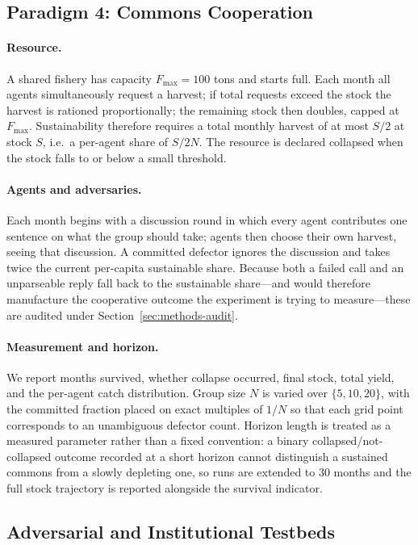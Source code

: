 \documentclass[manuscript,screen,review]{acmart}
\begin{document}
{\subsection{Paradigm 4: Commons Cooperation}
\label{sec:methods-govsim}
\paragraph{Resource.} A shared fishery has capacity $F_{\max}=100$ tons and
starts full. Each month all agents simultaneously request a harvest; if total
requests exceed the stock the harvest is rationed proportionally; the remaining
stock then doubles, capped at $F_{\max}$. Sustainability therefore requires a
total monthly harvest of at most $S/2$ at stock $S$, i.e.\ a per-agent share of
$S/2N$. The resource is declared collapsed when the stock falls to or below a
small threshold.

\paragraph{Agents and adversaries.} Each month begins with a discussion round in
which every agent contributes one sentence on what the group should take;
agents then choose their own harvest, seeing that discussion. A committed
defector ignores the discussion and takes twice the current per-capita
sustainable share. Because both a failed call and an unparseable reply fall back
to the sustainable share---and would therefore manufacture the cooperative
outcome the experiment is trying to measure---these are audited under
Section~\ref{sec:methods-audit}.

\paragraph{Measurement and horizon.} We report months survived, whether collapse
occurred, final stock, total yield, and the per-agent catch distribution. Group
size $N$ is varied over $\{5,10,20\}$, with the committed fraction placed on
exact multiples of $1/N$ so that each grid point corresponds to an unambiguous
defector count. Horizon length is treated as a measured parameter rather than a
fixed convention: a binary collapsed/not-collapsed outcome recorded at a short
horizon cannot distinguish a sustained commons from a slowly depleting one, so
runs are extended to $30$ months and the full stock trajectory is reported
alongside the survival indicator.

\subsection{Adversarial and Institutional Testbeds}
\label{sec:methods-adv}
}
\end{document}
